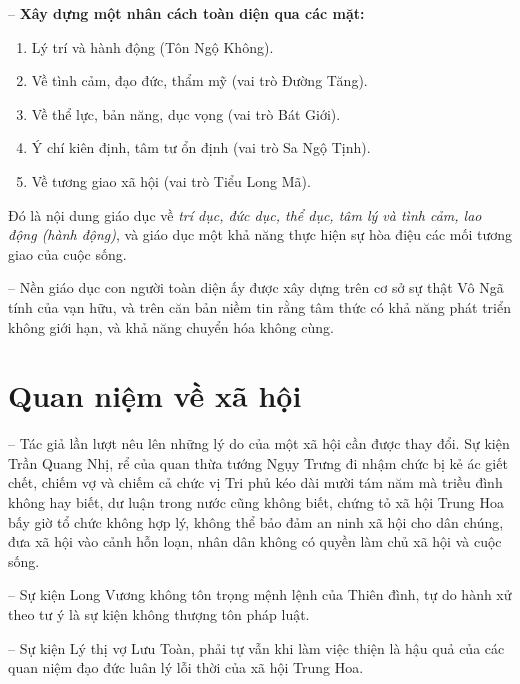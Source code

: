 -- {\bf Xây dựng một nhân cách toàn diện qua các mặt:}

\begin{enumerate}[label=\itshape\arabic*\upshape/]

    \item Lý trí và hành động (Tôn Ngộ Không).

    \item Về tình cảm, đạo đức, thẩm mỹ (vai trò Đường Tăng).

    \item Về thể lực, bản năng, dục vọng (vai trò Bát Giới).

    \item Ý chí kiên định, tâm tư ổn định (vai trò Sa Ngộ Tịnh).

    \item Về tương giao xã hội (vai trò Tiểu Long Mã).
\end{enumerate}

Đó là nội dung giáo dục về \emph{trí dục, đức dục, thể dục, tâm lý và tình cảm, lao động (hành động)}, và giáo dục một khả năng thực hiện sự hòa điệu các mối tương giao của cuộc sống.

-- Nền giáo dục con người toàn diện ấy được xây dựng trên cơ sở sự thật Vô Ngã tính của vạn hữu, và trên căn bản niềm tin rằng tâm thức có khả năng phát triển không giới hạn, và khả năng chuyển hóa không cùng.


\section{Quan niệm về xã hội} %
\label{sec:9_xa_hoi}

-- Tác giả lần lượt nêu lên những lý do của một xã hội cần được thay đổi. Sự kiện Trần Quang Nhị, rể của quan thừa tướng Ngụy Trưng đi nhậm chức bị kẻ ác giết chết, chiếm vợ và chiếm cả chức vị Tri phủ kéo dài mười tám năm mà triều đình không hay biết, dư luận trong nước cũng không biết, chứng tỏ xã hội Trung Hoa bấy giờ tổ chức không hợp lý, không thể bảo đảm an ninh xã hội cho dân chúng, đưa xã hội vào cảnh hỗn loạn, nhân dân không có quyền làm chủ xã hội và cuộc sống.

-- Sự kiện Long Vương không tôn trọng mệnh lệnh của Thiên đình, tự do hành xử theo tư ý là sự kiện không thượng tôn pháp luật.

-- Sự kiện Lý thị vợ Lưu Toàn, phải tự vẫn khi làm việc thiện là hậu quả của các quan niệm đạo đức luân lý lỗi thời của xã hội Trung Hoa.

